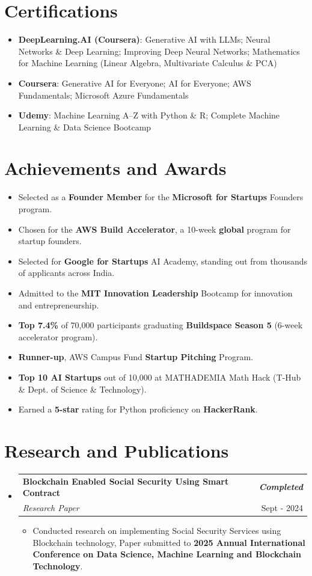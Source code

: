 \documentclass[a4paper,11pt]{article}
\makeatletter
\newcommand{\resumeItem}[2]{
  \item{
    \textbf{#1}{\hspace{0.5mm}#2 \vspace{-0.5mm}}
  }
}
\newcommand{\resumeSubheading}[4]{
\vspace{0.5mm}\item
    \begin{tabular*}{0.98\textwidth}[t]{l@{\extracolsep{\fill}}r}
        \textbf{#1} & \textit{\footnotesize{#4}} \\
        \textit{\footnotesize{#3}} &  \footnotesize{#2}\\
    \end{tabular*}
    \vspace{-2.4mm}
}
\newcommand{\resumeSubItem}[2]{\resumeItem{#1}{#2}\vspace{-4pt}}
\newcommand{\resumeSubHeadingListStart}{\begin{itemize}[leftmargin=*,labelsep=1mm]}
\newcommand{\resumeHeadingSkillStart}{\begin{itemize}[leftmargin=*,itemsep=1.7mm, rightmargin=2ex]}
\newcommand{\resumeItemListStart}{\begin{itemize}[leftmargin=3ex, labelsep=1mm, itemsep=0.5mm, rightmargin=0pt]}
\newcommand{\resumeSubHeadingListEnd}{\end{itemize}\vspace{2mm}}
\newcommand{\resumeHeadingSkillEnd}{\end{itemize}\vspace{-2mm}}
\newcommand{\resumeItemListEnd}{\end{itemize}\vspace{-2mm}}
\makeatother
\begin{document}
\section{\textbf{Certifications}}
\vspace{-0.4mm}
\resumeHeadingSkillStart
\resumeSubItem{DeepLearning.AI (Coursera)}{: Generative AI with LLMs; Neural Networks \& Deep Learning; Improving Deep Neural Networks; Mathematics for Machine Learning (Linear Algebra, Multivariate Calculus \& PCA)}
\resumeSubItem{Coursera}{: Generative AI for Everyone; AI for Everyone; AWS Fundamentals; Microsoft Azure Fundamentals}
\resumeSubItem{Udemy}{: Machine Learning A--Z with Python \& R; Complete Machine Learning \& Data Science Bootcamp}
\resumeHeadingSkillEnd
\vspace{-6mm}

\section{\textbf{Achievements} and \textbf{Awards}}
\vspace{-0.2mm}
\resumeSubHeadingListStart
\resumeItemListStart
\item Selected as a \textbf{Founder Member} for the \textbf{Microsoft for Startups} Founders program.
\item Chosen for the \textbf{AWS Build Accelerator}, a 10-week \textbf{global} program for startup founders.
\item Selected for \textbf{Google for Startups} AI Academy, standing out from thousands of applicants across India.
\item Admitted to the \textbf{MIT Innovation Leadership} Bootcamp for innovation and entrepreneurship.
\item \textbf{Top 7.4\%} of 70,000 participants graduating \textbf{Buildspace Season 5} (6-week accelerator program).
\item \textbf{Runner-up}, AWS Campus Fund \textbf{Startup Pitching} Program.
\item \textbf{Top 10 AI Startups} out of 10,000 at MATHADEMIA Math Hack (T-Hub \& Dept. of Science \& Technology).
\item Earned a \textbf{5-star} rating for Python proficiency on \textbf{HackerRank}.
\resumeItemListEnd
\resumeSubHeadingListEnd
\vspace{-6mm}

\section{\textbf{Research} and \textbf{Publications}}
\vspace{-0.4mm}
\resumeSubHeadingListStart
\resumeSubheading
{Blockchain Enabled Social Security Using Smart Contract}{Sept - 2024}
{Research Paper}{\textbf{Completed}}
\resumeItemListStart
\item Conducted research on implementing Social Security Services using Blockchain technology, Paper submitted to \textbf{2025 Annual International Conference on Data Science, Machine Learning and Blockchain Technology}.
\resumeItemListEnd
\resumeSubHeadingListEnd
\vspace{-5mm}
\end{document}
